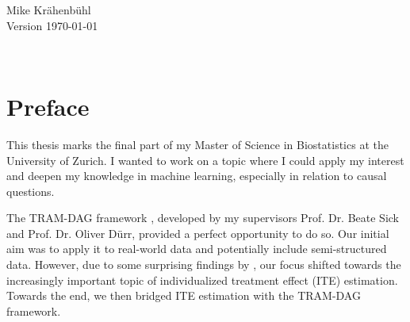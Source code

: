\documentclass[11pt,a4paper,twoside]{book}
\begin{document}


\graphicspath{{./figure/}}
\setcounter{tocdepth}{1}

\thispagestyle{empty}
\begin{center}


	\vspace*{6cm}{\bfseries\Huge
	Functional Modeling with Neural Causal Models and Personalized Treatment Effect Estimation 
	
	}


  \vfill
  \rm

  \LARGE
  Mike Kr{\"a}henb{\"u}hl\\[12mm]
  
  \normalsize
  Version \today
\end{center}
\newpage
\thispagestyle{empty}~
\newpage
{}

\thispagestyle{plain}
\tableofcontents
{}

\chapter*{Preface}
\thispagestyle{plain}



This thesis marks the final part of my Master of Science in Biostatistics at the University of Zurich. I wanted to work on a topic where I could apply my interest and deepen my knowledge in machine learning, especially in relation to causal questions.

The TRAM-DAG framework \citep{sick2025}, developed by my supervisors Prof. Dr. Beate Sick and Prof. Dr. Oliver D{\"u}rr, provided a perfect opportunity to do so. Our initial aim was to apply it to real-world data and potentially include semi-structured data. However, due to some surprising findings by \citet{chen2025}, our focus shifted towards the increasingly important topic of individualized treatment effect (ITE) estimation. Towards the end, we then bridged ITE estimation with the TRAM-DAG framework.
\end{document}
